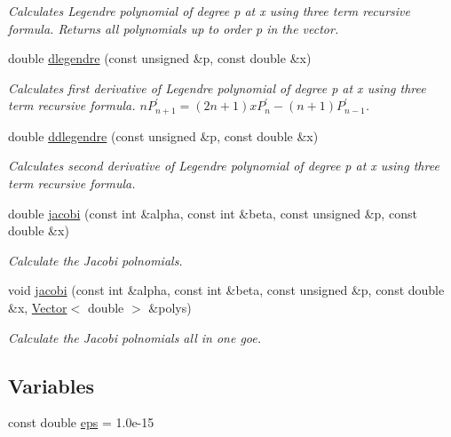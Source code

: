\begin{DoxyCompactItemize}
\begin{DoxyCompactList}\small\item\em Calculates Legendre polynomial of degree p at x using three term recursive formula. Returns all polynomials up to order p in the vector. \end{DoxyCompactList}\item 
double \hyperlink{namespaceoomph_1_1Orthpoly_a4062725a9af419d3c0a24927725e5435}{dlegendre} (const unsigned \&p, const double \&x)
\begin{DoxyCompactList}\small\item\em Calculates first derivative of Legendre polynomial of degree p at x using three term recursive formula. $ nP_{n+1}^{'} = (2n+1)xP_{n}^{'} - (n+1)P_{n-1}^{'} $. \end{DoxyCompactList}\item 
double \hyperlink{namespaceoomph_1_1Orthpoly_a560de3e87ebd12628426d853d8b4d5b3}{ddlegendre} (const unsigned \&p, const double \&x)
\begin{DoxyCompactList}\small\item\em Calculates second derivative of Legendre polynomial of degree p at x using three term recursive formula. \end{DoxyCompactList}\item 
double \hyperlink{namespaceoomph_1_1Orthpoly_ac25d63a7188b81c1462d6cb7f9a99790}{jacobi} (const int \&alpha, const int \&beta, const unsigned \&p, const double \&x)
\begin{DoxyCompactList}\small\item\em Calculate the Jacobi polnomials. \end{DoxyCompactList}\item 
void \hyperlink{namespaceoomph_1_1Orthpoly_a47ba7dd85f8851622d734e14e883cb9a}{jacobi} (const int \&alpha, const int \&beta, const unsigned \&p, const double \&x, \hyperlink{classoomph_1_1Vector}{Vector}$<$ double $>$ \&polys)
\begin{DoxyCompactList}\small\item\em Calculate the Jacobi polnomials all in one goe. \end{DoxyCompactList}\end{DoxyCompactItemize}
\subsection*{Variables}
\begin{DoxyCompactItemize}
\item 
const double \hyperlink{namespaceoomph_1_1Orthpoly_a52ec97f3d99bf542a69568fbdddd68ec}{eps} = 1.\+0e-\/15
\end{DoxyCompactItemize}


